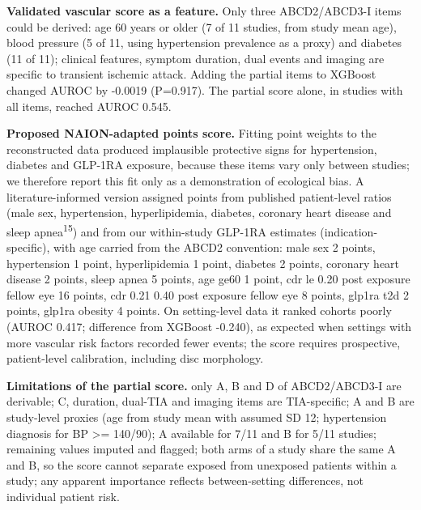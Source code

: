 \documentclass[
  11pt,
]{article}
\begin{document}
\textbf{Validated vascular score as a feature.} Only three ABCD2/ABCD3-I
items could be derived: age 60 years or older (7 of 11 studies, from
study mean age), blood pressure (5 of 11, using hypertension prevalence
as a proxy) and diabetes (11 of 11); clinical features, symptom
duration, dual events and imaging are specific to transient ischemic
attack. Adding the partial items to XGBoost changed AUROC by -0.0019
(P=0.917). The partial score alone, in studies with all items, reached
AUROC 0.545.

\textbf{Proposed NAION-adapted points score.} Fitting point weights to
the reconstructed data produced implausible protective signs for
hypertension, diabetes and GLP-1RA exposure, because these items vary
only between studies; we therefore report this fit only as a
demonstration of ecological bias. A literature-informed version assigned
points from published patient-level ratios (male sex, hypertension,
hyperlipidemia, diabetes, coronary heart disease and sleep
apnea\textsuperscript{15}) and from our within-study GLP-1RA estimates
(indication-specific), with age carried from the ABCD2 convention: male
sex 2 points, hypertension 1 point, hyperlipidemia 1 point, diabetes 2
points, coronary heart disease 2 points, sleep apnea 5 points, age ge60
1 point, cdr le 0.20 post exposure fellow eye 16 points, cdr 0.21 0.40
post exposure fellow eye 8 points, glp1ra t2d 2 points, glp1ra obesity 4
points. On setting-level data it ranked cohorts poorly (AUROC 0.417;
difference from XGBoost -0.240), as expected when settings with more
vascular risk factors recorded fewer events; the score requires
prospective, patient-level calibration, including disc morphology.

\textbf{Limitations of the partial score.} only A, B and D of
ABCD2/ABCD3-I are derivable; C, duration, dual-TIA and imaging items are
TIA-specific; A and B are study-level proxies (age from study mean with
assumed SD 12; hypertension diagnosis for BP \textgreater= 140/90); A
available for 7/11 and B for 5/11 studies; remaining values imputed and
flagged; both arms of a study share the same A and B, so the score
cannot separate exposed from unexposed patients within a study; any
apparent importance reflects between-setting differences, not individual
patient risk.
\end{document}
